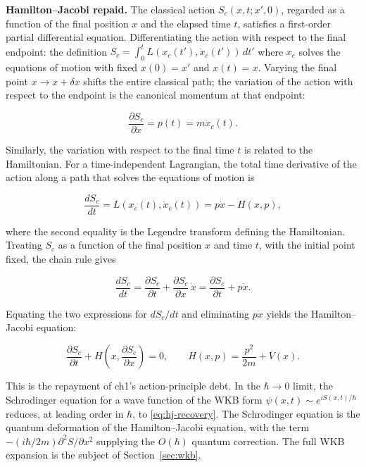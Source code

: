 \medskip\noindent\textbf{Hamilton--Jacobi repaid.}
The classical action $S_c(x,t;x',0)$, regarded as a function of the final position $x$ and the elapsed time $t$, satisfies a first-order partial differential equation. Differentiating the action with respect to the final endpoint: the definition $S_c = \int_0^t L(x_c(t'), \dot{x}_c(t'))\,dt'$ where $x_c$ solves the equations of motion with fixed $x(0)=x'$ and $x(t)=x$. Varying the final point $x \to x + \delta x$ shifts the entire classical path; the variation of the action with respect to the endpoint is the canonical momentum at that endpoint:
\begin{linenomath}
\begin{equation}
\frac{\partial S_c}{\partial x} = p(t) = m\dot{x}_c(t).
\end{equation}
\end{linenomath}
Similarly, the variation with respect to the final time $t$ is related to the Hamiltonian. For a time-independent Lagrangian, the total time derivative of the action along a path that solves the equations of motion is
\begin{linenomath}
\begin{equation}
\frac{d S_c}{dt} = L(x_c(t),\dot{x}_c(t)) = p\dot{x} - H(x,p),
\end{equation}
\end{linenomath}
where the second equality is the Legendre transform defining the Hamiltonian. Treating $S_c$ as a function of the final position $x$ and time $t$, with the initial point fixed, the chain rule gives
\begin{linenomath}
\begin{equation}
\frac{d S_c}{dt} = \frac{\partial S_c}{\partial t} + \frac{\partial S_c}{\partial x}\,\dot{x}
= \frac{\partial S_c}{\partial t} + p\dot{x}.
\end{equation}
\end{linenomath}
Equating the two expressions for $dS_c/dt$ and eliminating $p\dot{x}$ yields the Hamilton--Jacobi equation:
\begin{linenomath}
\begin{equation}
\frac{\partial S_c}{\partial t} + H\!\left(x, \frac{\partial S_c}{\partial x}\right) = 0,
\qquad
H(x,p) = \frac{p^2}{2m} + V(x).
\label{eq:hj-recovery}
\end{equation}
\end{linenomath}
This is the repayment of ch1's action-principle debt. In the $\hbar\to0$ limit, the Schrodinger equation for a wave function of the WKB form $\psi(x,t) \sim e^{iS(x,t)/\hbar}$ reduces, at leading order in $\hbar$, to \eqref{eq:hj-recovery}. The Schrodinger equation is the quantum deformation of the Hamilton--Jacobi equation, with the term $-(i\hbar/2m)\partial^2 S/\partial x^2$ supplying the $O(\hbar)$ quantum correction. The full WKB expansion is the subject of Section~\ref{sec:wkb}.

